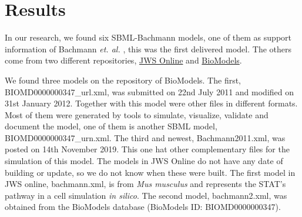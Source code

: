 \section*{Results} \label{resuslt}
In our research, we found six SBML-Bachmann models, one of them as support information of Bachmann \textit{et. al.} \cite{bachmannmodel}, this was the first delivered model. The others come from two different repositories, \hyperlink{https://www.systemsmedicine.net/posts/jws-online-biological-systems-modelling}{JWS Online} and \hyperlink{https://www.ebi.ac.uk/biomodels/}{BioModels}.

We found three models on the repository of BioModels. The first, \textsf{BIOMD0000000347\_url.xml}, was submitted on 22nd July 2011 and modified on 31st January 2012. Together with this model were other files in different formats. Most of them were generated by tools to simulate, visualize, validate and document the model, one of them is another SBML model, \textsf{BIOMD0000000347\_urn.xml}. The third and newest, Bachmann2011.xml, was posted on 14th November 2019. This one hat other complementary files for the simulation of this model. The models in JWS Online do not have any date of building or update, so we do not know when these were built. The first model in JWS online, bachmann.xml, is from \textit{Mus musculus} and represents the STAT's pathway in a cell simulation \textit{in silico}. The second model, \textsf{bachmann2.xml}, was obtained from the BioModels database (BioModels ID: BIOMD0000000347).